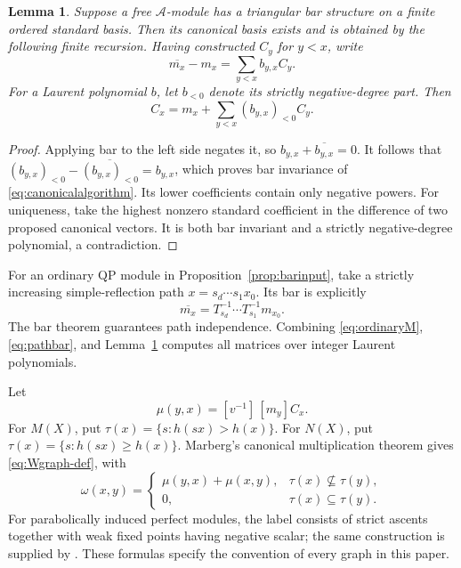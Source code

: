 \documentclass[11pt]{article}
\numberwithin{equation}{section}
\newtheorem{lemma}[theorem]{Lemma}
\theoremstyle{definition}
\newcommand{\A}{\mathcal A}
\begin{document}
\begin{lemma}\label{lem:canonicalalgorithm}
Suppose a free \(\A\)-module has a triangular bar structure on a finite ordered standard basis.
Then its canonical basis exists and is obtained by the following finite recursion.
Having constructed \(C_y\) for \(y<x\), write
\[
 \overline{m_x}-m_x=\sum_{y<x}b_{y,x}C_y .
\]
For a Laurent polynomial \(b\), let \(b_{<0}\) denote its strictly negative-degree part.
Then
\begin{equation}
 C_x=m_x+\sum_{y<x}(b_{y,x})_{<0}C_y .
 \label{eq:canonicalalgorithm}
\end{equation}
\end{lemma}
\begin{proof}
Applying bar to the left side negates it, so
\(b_{y,x}+\overline{b_{y,x}}=0\).
It follows that
\((b_{y,x})_{<0}-\overline{(b_{y,x})_{<0}}=b_{y,x}\),
which proves bar invariance of \eqref{eq:canonicalalgorithm}.
Its lower coefficients contain only negative powers.
For uniqueness, take the highest nonzero standard coefficient in the difference of two proposed canonical vectors.
It is both bar invariant and a strictly negative-degree polynomial, a contradiction.
\end{proof}

For an ordinary QP module in Proposition~\ref{prop:barinput}, take a strictly increasing simple-reflection path
\(x=s_d\cdots s_1x_0\).
Its bar is explicitly
\begin{equation}
 \overline{m_x}=T_{s_d}^{-1}\cdots T_{s_1}^{-1}m_{x_0}.
 \label{eq:pathbar}
\end{equation}
The bar theorem guarantees path independence.
Combining \eqref{eq:ordinaryM}, \eqref{eq:pathbar}, and Lemma~\ref{lem:canonicalalgorithm} computes all matrices over integer Laurent polynomials.

Let
\[
 \mu(y,x)=[v^{-1}]\,[m_y]C_x.
\]
For \(M(X)\), put \(\tau(x)=\{s:h(sx)>h(x)\}\).
For \(N(X)\), put \(\tau(x)=\{s:h(sx)\geq h(x)\}\).
Marberg's canonical multiplication theorem gives \eqref{eq:Wgraph-def}, with
\begin{equation}
 \omega(x,y)=
 \begin{cases}
 \mu(y,x)+\mu(x,y),&\tau(x)\not\subseteq\tau(y),\\
 0,&\tau(x)\subseteq\tau(y).
 \end{cases}
 \label{eq:canonicalweights}
\end{equation}
For parabolically induced perfect modules, the label consists of strict ascents together with weak fixed points having negative scalar; the same construction is supplied by \cite{MZgraphs,HY1,HY2}.
These formulas specify the convention of every graph in this paper.
\end{document}
